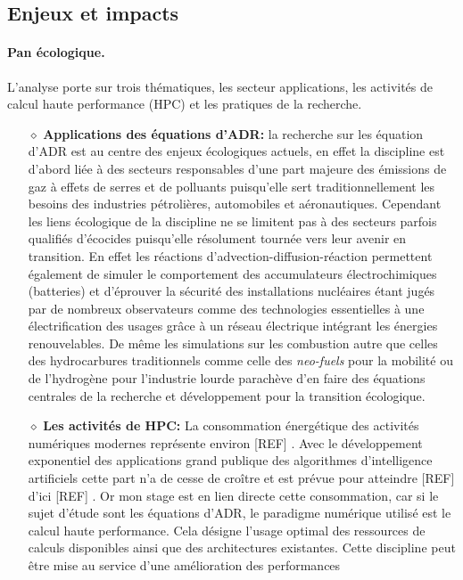 \documentclass[11pt,a4paper]{article}
\begin{document}
  \subsection{Enjeux et impacts}
    \paragraph{Pan écologique.}
      L'analyse porte sur trois thématiques, les secteur applications, les activités de calcul haute performance (HPC) et les pratiques de la recherche.
      \begin{itemize}
      \item[$\diamond$]\textbf{Applications des équations d'ADR:} la recherche sur les équation d'ADR est au centre des enjeux écologiques actuels, en effet la discipline est d'abord 
      liée à des secteurs responsables d'une part majeure des émissions de gaz à effets de serres et de polluants puisqu'elle sert traditionnellement
      les besoins des industries pétrolières, automobiles et aéronautiques. 
      Cependant les liens écologique de la discipline ne se limitent pas à des secteurs parfois qualifiés d'écocides puisqu’elle résolument tournée vers leur avenir en transition. 
      En effet les réactions d'advection-diffusion-réaction permettent également de simuler le comportement des accumulateurs électrochimiques (batteries) et
      d'éprouver la sécurité des installations nucléaires étant jugés par de nombreux observateurs comme des technologies essentielles à une électrification des usages grâce à un réseau électrique intégrant les énergies renouvelables.
      De même les simulations sur les combustion autre que celles des hydrocarbures traditionnels comme celle des \textit{neo-fuels} pour la mobilité ou de l'hydrogène pour l'industrie lourde
      parachève d'en faire des équations centrales de la recherche et développement pour la transition écologique.
      \item[$\diamond$]\textbf{Les activités de HPC:} La consommation énergétique des activités numériques modernes représente environ [REF] . Avec le développement exponentiel
      des applications grand publique des algorithmes d'intelligence artificiels cette part n'a de cesse de croître et est prévue pour atteindre [REF] d'ici [REF] .
      Or mon stage est en lien directe cette consommation, car si le sujet d'étude sont les équations d'ADR, le paradigme numérique utilisé est le calcul haute performance. 
      Cela désigne l'usage optimal des ressources de calculs disponibles ainsi que des architectures existantes. Cette discipline peut être mise au service d'une amélioration des performances

\end{itemize}
\end{document}
